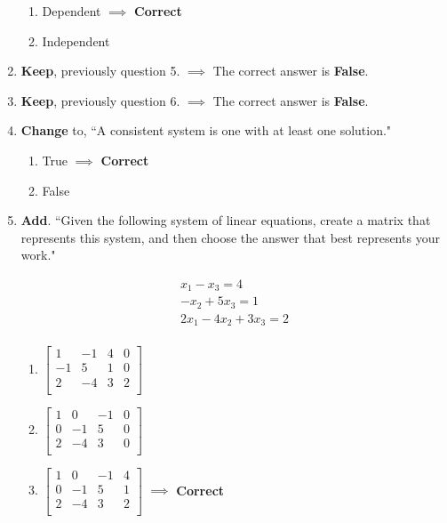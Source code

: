 \documentclass[fleqn]{article}[11pt]
\begin{document}
\begin{enumerate}
		\begin{enumerate}
			\item Dependent $\implies$ \textbf{Correct}
			\item Independent
		\end{enumerate}
	\item \textbf{Keep}, previously question 5. $\implies$ The correct answer is \textbf{False}.
	\item \textbf{Keep}, previously question 6. $\implies$ The correct answer is \textbf{False}.
	\item \textbf{Change} to, ``A consistent system is one with at least one solution."
	
		\begin{enumerate}
			\item True $\implies$ \textbf{Correct}
			\item False
		\end{enumerate}
		
	\item \textbf{Add}. ``Given the following system of linear equations, create a matrix that represents this system, and then choose the answer that best represents your work."
	
		\begin{eqnarray*}
			x_{1}-x_{3}=4 \\
			-x_{2}+5x_{3}=1 \\
			2x_{1}-4x_{2}+3x_{3}=2 \\
		\end{eqnarray*}
			\begin{enumerate}
				\item \(\begin{bmatrix}
						1 & -1 & 4 & 0 \\
					       -1 & 5 & 1 & 0 \\
						2 & -4 & 3 & 2 \\
					 \end{bmatrix}\)
				\item \(\begin{bmatrix}
						1 & 0 & -1 & 0 \\
						0 & -1 & 5 & 0 \\
						2 & -4 & 3 & 0 \\
					 \end{bmatrix}\)
			
				\item \(\begin{bmatrix}
						1 & 0 & -1 & 4 \\
						0 & -1 & 5 & 1 \\
						2 & -4 & 3 & 2 \\
					 \end{bmatrix}\) $\implies$ \textbf{Correct}


\end{enumerate}
\end{enumerate}
\end{document}
